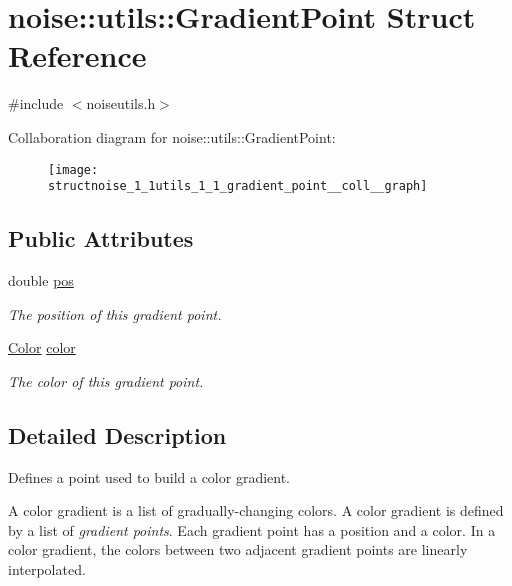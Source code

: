 \hypertarget{structnoise_1_1utils_1_1_gradient_point}{\section{noise\+:\+:utils\+:\+:Gradient\+Point Struct Reference}
\label{structnoise_1_1utils_1_1_gradient_point}
}


{\ttfamily \#include $<$noiseutils.\+h$>$}



Collaboration diagram for noise\+:\+:utils\+:\+:Gradient\+Point\+:\nopagebreak
\begin{figure}[H]
\begin{center}
\leavevmode
\texttt{[image: structnoise\_1\_1utils\_1\_1\_gradient\_point\_\_coll\_\_graph]}
\end{center}
\end{figure}
\subsection*{Public Attributes}
\begin{DoxyCompactItemize}
\item 
double \hyperlink{structnoise_1_1utils_1_1_gradient_point_ab47a3602fe5727745eb01c46068511bb}{pos}
\begin{DoxyCompactList}\small\item\em The position of this gradient point. \end{DoxyCompactList}\item 
\hyperlink{classnoise_1_1utils_1_1_color}{Color} \hyperlink{structnoise_1_1utils_1_1_gradient_point_ab2949090d09f62737077fb26873a9fc8}{color}
\begin{DoxyCompactList}\small\item\em The color of this gradient point. \end{DoxyCompactList}\end{DoxyCompactItemize}


\subsection{Detailed Description}
Defines a point used to build a color gradient.

A color gradient is a list of gradually-\/changing colors. A color gradient is defined by a list of {\itshape gradient points}. Each gradient point has a position and a color. In a color gradient, the colors between two adjacent gradient points are linearly interpolated.

